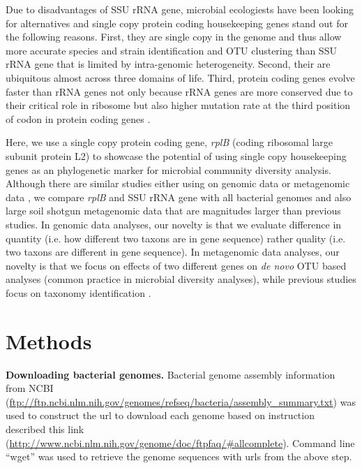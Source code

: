\documentclass[]{msu-thesis}
\begin{document}
Due to disadvantages of SSU rRNA gene, microbial ecologiests have been looking for alternatives and single copy protein coding housekeeping genes stand out for the following reasons. First, they are single copy in the genome and thus allow more accurate species and strain identification and OTU clustering than SSU rRNA gene that is limited by intra-genomic heterogeneity. Second, their are ubiquitous almost across three domains of life. Third, protein coding genes evolve faster than rRNA genes not only because rRNA genes are more conserved due to their critical role in ribosome \cite{carter_functional_2000} but also higher mutation rate at the third position of codon in protein coding genes \cite{case_use_2007}.

Here, we use a single copy protein coding gene, \textit{rplB} (coding ribosomal large subunit protein L2) to showcase the potential of using single copy housekeeping genes as an phylogenetic marker for microbial community diversity analysis. Although there are similar studies either using on genomic data or metagenomic data \cite{case_use_2007,roux_comparison_2011}, we compare \textit{rplB} and SSU rRNA gene with all bacterial genomes and also large soil shotgun metagenomic data that are magnitudes larger than previous studies. In genomic data analyses, our novelty is that we evaluate difference in quantity (i.e. how different two taxons are in gene sequence) rather quality (i.e. two taxons are different in gene sequence). In metagenomic data analyses, our novelty is that we focus on effects of two different genes on \textit{de novo} OTU based analyses (common practice in microbial diversity analyses), while previous studies focus on taxonomy identification \cite{case_use_2007,roux_comparison_2011}. 

\section{Methods}

\textbf{Downloading bacterial genomes. }
Bacterial genome assembly information from NCBI 
(\url{ftp://ftp.ncbi.nlm.nih.gov/genomes/refseq/bacteria/assembly\_summary.txt})
was used to construct the url to download each genome based on instruction described this link (\url{http://www.ncbi.nlm.nih.gov/genome/doc/ftpfaq/\#allcomplete}). Command line ``wget'' was used to retrieve the genome sequences with urls from the above step.
\end{document}

